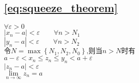 \subsection{\ref{eq:squeeze_theorem}}
\begin{center}
    $\forall \varepsilon > 0$\\
$\left|x_n-a\right|<\varepsilon\qquad\forall n>N_1$\\
$\left|y_n-a\right|<\varepsilon\qquad\forall n>N_2$\\
$\mbox{令}N = \max\left\{{N_1,N_2,N_0}\right\}\mbox{,则当}n > N\mbox{时有}$\\
$a-\varepsilon<x_n\le z_n\le y_n < a+\varepsilon$\\
$\left|z_n-a\right|<\varepsilon$\\
$\lim\limits_{{n}\to{\infty}}z_n = a$
\end{center}

